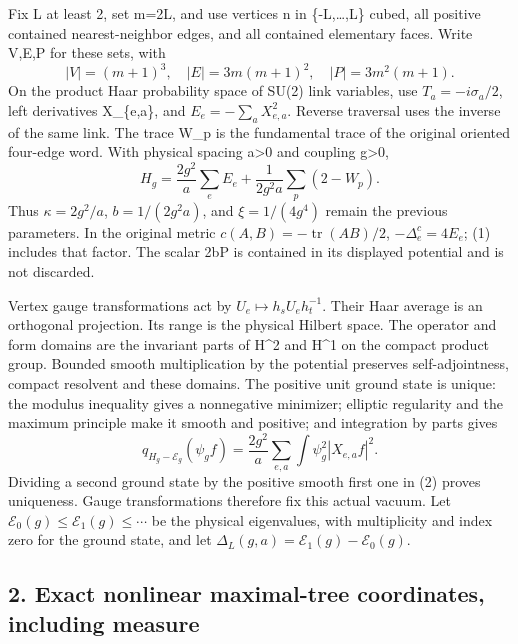 \documentclass[
  11pt,
]{article}
\begin{document}
Fix L at least 2, set m=2L, and use vertices n in \{-L,\ldots,L\} cubed,
all positive contained nearest-neighbor edges, and all contained
elementary faces. Write V,E,P for these sets, with \[
 |V|=(m+1)^3,\quad |E|=3m(m+1)^2,\quad |P|=3m^2(m+1).
\] On the product Haar probability space of SU(2) link variables, use
\(T_a=-i\sigma_a/2\), left derivatives X\_\{e,a\}, and
\(E_e=-\sum_aX_{e,a}^2\). Reverse traversal uses the inverse of the same
link. The trace W\_p is the fundamental trace of the original oriented
four-edge word. With physical spacing a\textgreater0 and coupling
g\textgreater0, \[
 H_g=\frac{2g^2}{a}\sum_e E_e
       +\frac1{2g^2a}\sum_p(2-W_p).
\tag{1}
\] Thus \(\kappa=2g^2/a\), \(b=1/(2g^2a)\), and \(\xi=1/(4g^4)\) remain
the previous parameters. In the original metric
\(c(A,B)=-\operatorname{tr}(AB)/2\), \(-\Delta_e^c=4E_e\); (1) includes
that factor. The scalar 2b\textbar P\textbar{} is contained in its
displayed potential and is not discarded.

Vertex gauge transformations act by \(U_e\mapsto h_sU_eh_t^{-1}\). Their
Haar average is an orthogonal projection. Its range is the physical
Hilbert space. The operator and form domains are the invariant parts of
H\^{}2 and H\^{}1 on the compact product group. Bounded smooth
multiplication by the potential preserves self-adjointness, compact
resolvent and these domains. The positive unit ground state is unique:
the modulus inequality gives a nonnegative minimizer; elliptic
regularity and the maximum principle make it smooth and positive; and
integration by parts gives \[
 q_{H_g-\mathcal E_g}(\psi_g f)
       =\frac{2g^2}{a}\sum_{e,a}\int\psi_g^2|X_{e,a}f|^2.
\tag{2}
\] Dividing a second ground state by the positive smooth first one in
(2) proves uniqueness. Gauge transformations therefore fix this actual
vacuum. Let \(\mathcal E_0(g)\le\mathcal E_1(g)\le\cdots\) be the
physical eigenvalues, with multiplicity and index zero for the ground
state, and let \(\Delta_L(g,a)=\mathcal E_1(g)-\mathcal E_0(g)\).

\subsection{2. Exact nonlinear maximal-tree coordinates, including
measure}\label{weak-coupling-part-1-exact-nonlinear-maximal-tree-coordinates-including-measure}
\end{document}
